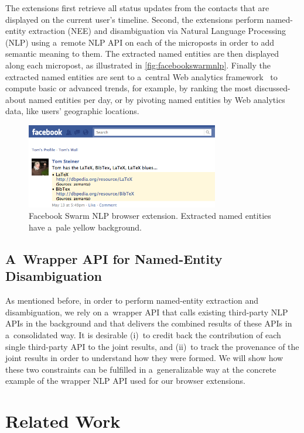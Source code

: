 The extensions first retrieve all status updates
from the contacts that are displayed
on the current user's timeline.
Second, the extensions perform named-entity extraction (NEE)
and disambiguation via Natural Language Processing (NLP)
using a~remote NLP API on each of the microposts
in order to add semantic meaning to them.
The extracted named entities are then displayed
along each micropost, as illustrated in \autoref{fig:facebookswarmnlp}.
Finally the extracted named entities
are sent to a~central Web analytics framework~\cite{kaushik2009analytics}
to compute basic or advanced trends, for example,
by ranking the most discussed-about named entities per day,
or by pivoting named entities by Web analytics data,
like users' geographic locations.

\begin{figure}[!ht]
  \centering
  \includegraphics[width=0.75\textwidth]{facebook-swarm-nlp.png}
  \caption[Facebook Swarm NLP browser extension]
    {Facebook Swarm NLP browser extension.
    Extracted named entities have a~pale yellow background.}     
  \label{fig:facebookswarmnlp}
\end{figure}

\subsection{A~Wrapper API for Named-Entity Disambiguation}

As mentioned before, in order to perform named-entity extraction
and disambiguation, we rely on a~wrapper API
that calls existing third-party NLP APIs in the background
and that delivers the combined results of these APIs
in a~consolidated way.
It is  desirable
(i)~to credit back the contribution of each single third-party API
to the joint results, and
(ii)~to track the provenance of the joint results
in order to understand how they were formed.
We will show how these two constraints
can be fulfilled in a~generalizable way
at the concrete example of the wrapper NLP API
used for our browser extensions.

\section{Related Work}

